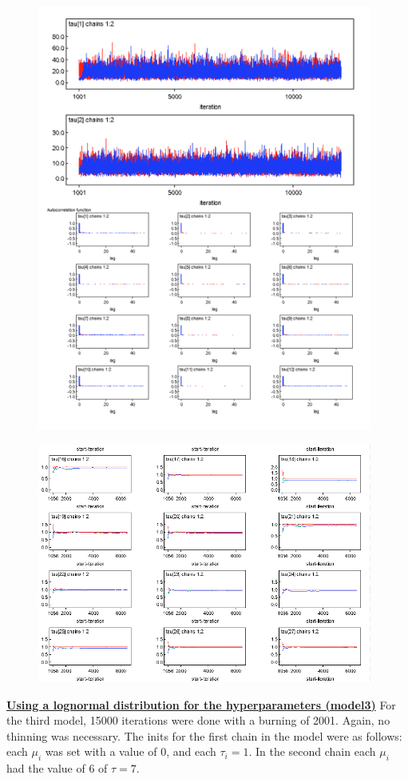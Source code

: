 \documentclass{article}
\begin{document}
\newpage
\begin{figure}[ht!]
\centering
\includegraphics[width=11cm]{figures/model2_tau.png}
\end{figure}
\begin{figure}[ht!]
\centering
\includegraphics[width=11cm]{figures/model2_tau2.png}
\end{figure}


\newpage
\underline{\textbf{Using a lognormal distribution for the hyperparameters (model3)}}
For the third model, 15000 iterations were done with a burning of 2001. Again, no thinning was necessary. The inits for the first chain in the model were as follows: each $\mu_i$ was set with a value of 0, and each $\tau_i=1$. In the second chain each $\mu_i$ had the value of 6 of $\tau = 7$.  
\end{document}
